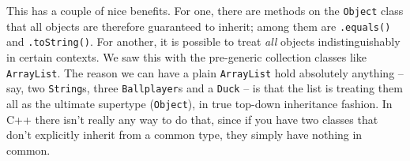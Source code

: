 This has a couple of nice benefits. For one, there are methods on the
\texttt{Object} class that all objects are therefore guaranteed to inherit;
among them are \texttt{.equals()} and \texttt{.toString()}. For another, it is
possible to treat \textit{all} objects indistinguishably in certain contexts.
We saw this with the pre-generic collection classes like \texttt{ArrayList}.
The reason we can have a plain \texttt{ArrayList} hold absolutely anything --
say, two \texttt{String}s, three \texttt{Ballplayer}s and a \texttt{Duck} --
is that the list is treating them all as the ultimate supertype
(\texttt{Object}), in true top-down inheritance fashion. In C++ there isn't
really any way to do that, since if you have two classes that don't explicitly
inherit from a common type, they simply have nothing in common.

